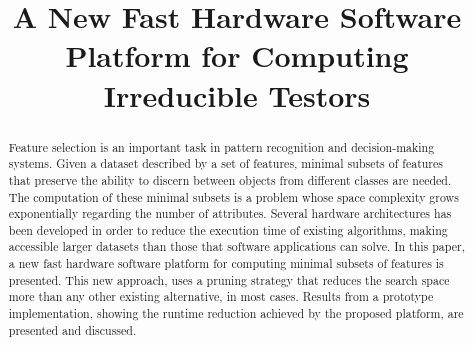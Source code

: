\documentclass[authoryear,preprint,review,12pt]{elsarticle}
\begin{document}
\begin{frontmatter}



\title{A New Fast Hardware Software Platform for Computing Irreducible Testors}



\address{Computer Science Department}
\address{National Institute for Astrophysics, Optics and Electronics}
\address{Sta. Ma. Tonanzintla, Puebla, 72840, Mexico}

\begin{abstract}
Feature selection is an important task in pattern recognition and decision-making systems. Given a dataset
described by a set of features, minimal subsets of features that preserve the ability to discern between
objects from different classes are needed. The computation of these minimal subsets is a problem whose space 
complexity grows exponentially regarding the number of attributes. 
Several hardware architectures has been developed in order to reduce the execution time of existing algorithms,
making accessible larger datasets than those that software applications can solve.
In this paper, a new fast hardware software platform for computing minimal subsets of features is presented.
This new approach, uses a pruning strategy that reduces the search space more than any other existing alternative,
in most cases.
Results from a prototype implementation, showing the runtime reduction achieved by the proposed platform, are
presented and discussed.


\end{abstract}
\end{frontmatter}
\end{document}
